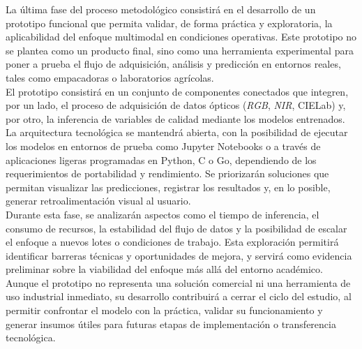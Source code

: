 La última fase del proceso metodológico consistirá en el desarrollo de un prototipo funcional que permita validar, de forma práctica y exploratoria, la aplicabilidad del enfoque multimodal en condiciones operativas. Este prototipo no se plantea como un producto final, sino como una herramienta experimental para poner a prueba el flujo de adquisición, análisis y predicción en entornos reales, tales como empacadoras o laboratorios agrícolas.\\

El prototipo consistirá en un conjunto de componentes conectados que integren, por un lado, el proceso de adquisición de datos ópticos (\textit{RGB}, \textit{NIR}, CIELab) y, por otro, la inferencia de variables de calidad mediante los modelos entrenados. La arquitectura tecnológica se mantendrá abierta, con la posibilidad de ejecutar los modelos en entornos de prueba como Jupyter Notebooks o a través de aplicaciones ligeras programadas en Python, C o Go, dependiendo de los requerimientos de portabilidad y rendimiento. Se priorizarán soluciones que permitan visualizar las predicciones, registrar los resultados y, en lo posible, generar retroalimentación visual al usuario.\\

Durante esta fase, se analizarán aspectos como el tiempo de inferencia, el consumo de recursos, la estabilidad del flujo de datos y la posibilidad de escalar el enfoque a nuevos lotes o condiciones de trabajo. Esta exploración permitirá identificar barreras técnicas y oportunidades de mejora, y servirá como evidencia preliminar sobre la viabilidad del enfoque más allá del entorno académico.\\

Aunque el prototipo no representa una solución comercial ni una herramienta de uso industrial inmediato, su desarrollo contribuirá a cerrar el ciclo del estudio, al permitir confrontar el modelo con la práctica, validar su funcionamiento y generar insumos útiles para futuras etapas de implementación o transferencia tecnológica.